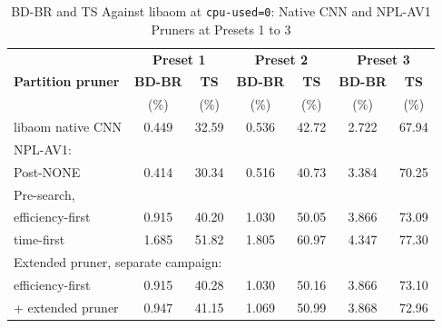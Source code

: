 \documentclass[conference]{IEEEtran}
\begin{document}
\begin{table}[!t]
\renewcommand{\arraystretch}{1.1}
\caption{BD-BR and TS Against libaom at \texttt{cpu-used=0}: Native CNN and
NPL-AV1 Pruners at Presets 1 to 3}
\label{tab_replace}
\centering
\setlength{\tabcolsep}{3pt}
\begin{tabular}{lcccccc}
\hline
 & \multicolumn{2}{c}{\textbf{Preset 1}} & \multicolumn{2}{c}{\textbf{Preset 2}}
 & \multicolumn{2}{c}{\textbf{Preset 3}} \\
\textbf{Partition pruner} & \textbf{BD-BR} & \textbf{TS} & \textbf{BD-BR} & \textbf{TS}
 & \textbf{BD-BR} & \textbf{TS} \\
 & (\%) & (\%) & (\%) & (\%) & (\%) & (\%) \\
\hline
libaom native CNN & 0.449 & 32.59 & 0.536 & 42.72 & 2.722 & 67.94 \\
\hline
\multicolumn{7}{l}{NPL-AV1:} \\
\quad Post-NONE & 0.414 & 30.34 & 0.516 & 40.73 & 3.384 & 70.25 \\
\quad Pre-search, & & & & & & \\
\quad\quad efficiency-first & 0.915 & 40.20 & 1.030 & 50.05 & 3.866 & 73.09 \\
\quad\quad time-first & 1.685 & 51.82 & 1.805 & 60.97 & 4.347 & 77.30 \\
\hline
\multicolumn{7}{l}{Extended pruner, separate campaign:} \\
\quad efficiency-first & 0.915 & 40.28 & 1.030 & 50.16 & 3.866 & 73.10 \\
\quad + extended pruner & 0.947 & 41.15 & 1.069 & 50.99 & 3.868 & 72.96 \\
\hline
\end{tabular}
\end{table}
\end{document}
